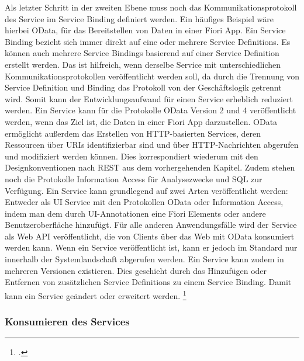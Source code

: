 Als letzter Schritt in der zweiten Ebene muss noch das Kommunikationsprotokoll des Service im Service Binding definiert werden. Ein häufiges Beispiel wäre hierbei OData, für das Bereitstellen von Daten in einer Fiori App. Ein Service Binding bezieht sich immer direkt auf eine oder mehrere Service Definitions. Es können auch mehrere Service Bindings basierend auf einer Service Definition erstellt werden. Das ist \zB hilfreich, wenn derselbe Service mit unterschiedlichen Kommunikationsprotokollen veröffentlicht werden soll, da durch die Trennung von Service Definition und Binding das Protokoll von der Geschäftslogik getrennt wird. Somit kann der Entwicklungsaufwand für einen Service erheblich reduziert werden. Ein Service kann für die Protokolle OData Version 2 und 4 veröffentlicht werden, wenn das Ziel ist, die Daten in einer Fiori App darzustellen. OData ermöglicht au{\ss}erdem das Erstellen von HTTP-basierten Services, deren Ressourcen über URIs identifizierbar sind und über HTTP-Nachrichten abgerufen und modifiziert werden können. Dies korrespondiert wiederum mit den Designkonventionen nach REST aus dem vorhergehenden Kapitel. Zudem stehen noch die Protokolle Information Access für Analysezwecke und SQL zur Verfügung. Ein Service kann grundlegend auf zwei Arten veröffentlicht werden: Entweder als UI Service mit den Protokollen OData oder Information Access, indem man dem durch UI-Annotationen eine Fiori Elements oder andere Benutzeroberfläche hinzufügt. Für alle anderen Anwendungsfälle wird der Service als Web API veröffentlicht, die von Clients über das Web mit OData konsumiert werden kann. Wenn ein Service veröffentlicht ist, kann er jedoch im Standard nur innerhalb der Systemlandschaft abgerufen werden. Ein Service kann zudem in mehreren Versionen existieren. Dies geschieht durch das Hinzufügen oder Entfernen von zusätzlichen Service Definitions zu einem Service Binding. Damit kann ein Service geändert oder erweitert werden. \footcite[Vgl.][]{sap_rap_2023}

\subsubsection{Konsumieren des Services}

